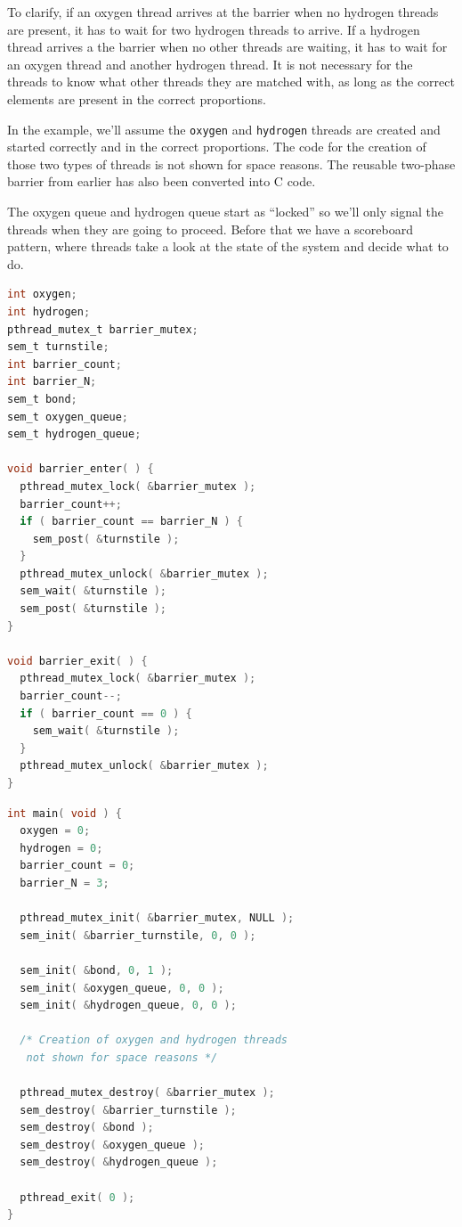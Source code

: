 \documentclass[a4paper]{report}
\begin{document}
To clarify, if an oxygen thread arrives at the barrier when no hydrogen threads are present, it has to wait for two hydrogen threads to arrive. If a hydrogen thread arrives a the barrier when no other threads are waiting, it has to wait for an oxygen thread and another hydrogen thread. It is not necessary for the threads to know what other threads they are matched with, as long as the correct elements are present in the correct proportions.

In the example, we'll assume the \texttt{oxygen} and \texttt{hydrogen} threads are created and started correctly and in the correct proportions. The code for the creation of those two types of threads is not shown for space reasons. The reusable two-phase barrier from earlier has also been converted into C code.

The oxygen queue and hydrogen queue start as ``locked'' so we'll only signal the threads when they are going to proceed. Before that we have a scoreboard pattern, where threads take a look at the state of the system and decide what to do.

\begin{multicols}{2}
	\begin{lstlisting}[firstline=0, language=C]
int oxygen;
int hydrogen;
pthread_mutex_t barrier_mutex;
sem_t turnstile;
int barrier_count;
int barrier_N;
sem_t bond;
sem_t oxygen_queue;
sem_t hydrogen_queue;

void barrier_enter( ) {
  pthread_mutex_lock( &barrier_mutex );
  barrier_count++;
  if ( barrier_count == barrier_N ) {
    sem_post( &turnstile );
  }
  pthread_mutex_unlock( &barrier_mutex );
  sem_wait( &turnstile );
  sem_post( &turnstile );            
}

void barrier_exit( ) {
  pthread_mutex_lock( &barrier_mutex );
  barrier_count--;
  if ( barrier_count == 0 ) {
    sem_wait( &turnstile );
  }
  pthread_mutex_unlock( &barrier_mutex );
}


\end{lstlisting}
	\columnbreak
	\begin{lstlisting}[language=C]
int main( void ) {
  oxygen = 0;
  hydrogen = 0;
  barrier_count = 0;
  barrier_N = 3;

  pthread_mutex_init( &barrier_mutex, NULL );
  sem_init( &barrier_turnstile, 0, 0 );
  
  sem_init( &bond, 0, 1 );
  sem_init( &oxygen_queue, 0, 0 );
  sem_init( &hydrogen_queue, 0, 0 ); 

  /* Creation of oxygen and hydrogen threads
   not shown for space reasons */

  pthread_mutex_destroy( &barrier_mutex );
  sem_destroy( &barrier_turnstile );
  sem_destroy( &bond );
  sem_destroy( &oxygen_queue );
  sem_destroy( &hydrogen_queue );   

  pthread_exit( 0 );
}

\end{lstlisting}
\end{multicols}
\end{document}
